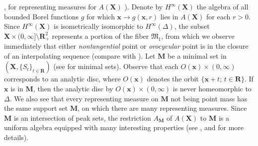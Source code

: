 \documentclass[12pt]{amsart}
\theoremstyle{plain}
\numberwithin{equation}{section}
\begin{document}
\cite{T1}, \cite{T2} for representing measures for $A(\mathbf{X})$ ).
Denote by $H^\infty(\mathbf{X})$ the algebra of all bounded Borel
functions $g$ for which $\mathbf{x}\to g(\mathbf{x},r)$ lies in
$A(\mathbf{X})$ for each $r>0$. Since $H^\infty(\mathbf{X})$ is
isometrically isomorphic to $H^\infty(\Delta)$, the subset
$\mathbf{X}\times (0,\infty]\setminus \mathbf{R}^2_+$ represents
a portion of the fiber $\mathfrak{M}_1$, from which we observe
immediately that either \textit{nontangential} point or
\textit{orocycular} point is in the closure of an interpolating
sequence (compare with \cite[Chapter X, Excersises 1 and 2]{Ga}).
Let $\mathbf{M}$ be a minimal set in
$(\mathbf{X},\{S_t\}_{t\in\mathbf{R}})$ (see \cite{P} for minimal
sets). Observe that each $\textit{O}(\mathbf{x})\times (0,\infty)$
corresponds to an analytic disc, where $\textit{O}(\mathbf{x})$
denotes the orbit $\{\mathbf{x}+t ;\, t \in \mathbf{R}\}$. If
$\mathbf{x}$ is in $\mathbf{M}$, then the analytic disc by
$\textit{O}(\mathbf{x})\times (0,\infty)$ is never homeomorphic to $\Delta$.
We also see that every representing measure on $\mathbf{M}$ not being
point mass has the same support set $\mathbf{M}$, on which there are
many representing measures. Since $\mathbf{M}$ is an intersection
of peak sets, the restriction $A_\mathbf{M}$ of $A(\mathbf{X})$ to
$\mathbf{M}$ is a uniform algebra equipped with many interesting
properties (see \cite{M1}, \cite{M2} and \cite{T3} for more details).

\bigskip
\bigskip
\end{document}

